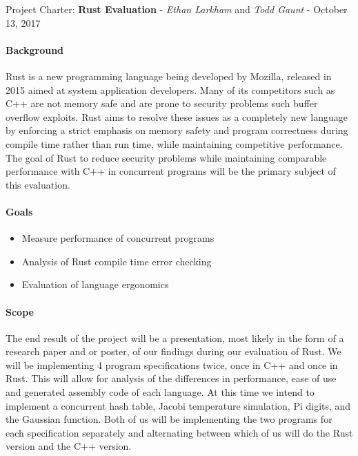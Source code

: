 \documentclass[10pt,a4paper]{report}
\begin{document}
\begin{center}
	{\Large Project Charter: {\bfseries Rust Evaluation}}
	- {\large{\itshape Ethan Larkham} and {\itshape Todd Gaunt}}
	- {\large October 13, 2017}
\end{center}
\vspace{0.5em}
\paragraph{Background}
Rust is a new programming language being developed by Mozilla, released in 2015
aimed at system application developers. Many of its competitors such as C++ are
not memory safe and are prone to security problems such buffer overflow
exploits. Rust aims to resolve these issues as a completely new language by
enforcing a strict emphasis on memory safety and program correctness during
compile time rather than run time, while maintaining competitive performance.
The goal of Rust to reduce security problems while maintaining comparable
performance with C++ in concurrent programs will be the primary subject of this
evaluation.
\paragraph{Goals}
\begin{flushleft}
	\begin{itemize}
		\item Measure performance of concurrent programs
		\item Analysis of Rust compile time error checking
		\item Evaluation of language ergonomics
	\end{itemize}
\end{flushleft}
\paragraph{Scope}
The end result of the project will be a presentation, most likely in the form
of a research paper and or poster, of our findings during our evaluation of
Rust.  We will be implementing 4 program specifications twice, once in C++ and
once in Rust. This will allow for analysis of the differences in performance,
ease of use and generated assembly code of each language. At this time we
intend to implement a concurrent hash table, Jacobi temperature simulation,  Pi
digits, and the Gaussian function. Both of us will be implementing the two
programs for each specification separately and alternating between which of us
will do the Rust version and the C++ version.
\end{document}
